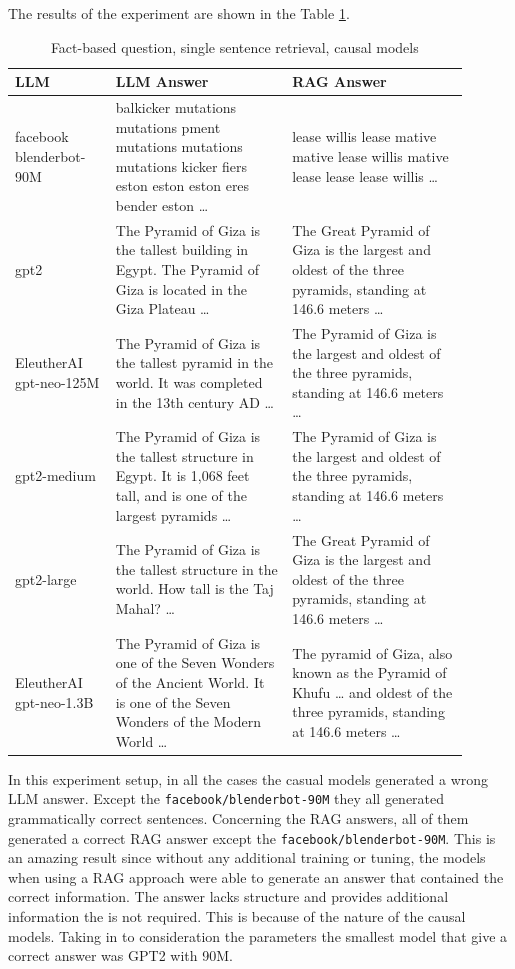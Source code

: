 \documentclass{wseas}
\begin{document}
The results of the experiment are shown in the Table \ref{tab:experiment_R_1_sentence_Q_fact_M_casual_table}.
\begin{table}[htbp]
  \centering
  \caption{Fact-based question, single sentence retrieval, causal models}
  \label{tab:experiment_R_1_sentence_Q_fact_M_casual_table}
    \begin{tabular}{|p{0.20\linewidth}|p{0.35\linewidth}|p{0.35\linewidth}|}
      \hline
      \textbf{LLM} & \textbf{LLM Answer} & \textbf{RAG Answer} \\ \hline
      facebook blenderbot-90M & balkicker mutations mutations pment mutations mutations mutations kicker fiers eston eston eston eres bender eston \ldots{} & lease willis lease mative mative lease willis mative lease lease lease willis \ldots{} \\ \hline
      gpt2 & The Pyramid of Giza is the tallest building in Egypt. The Pyramid of Giza is located in the Giza Plateau \ldots{} & The Great Pyramid of Giza is the largest and oldest of the three pyramids, standing at 146.6 meters \ldots{} \\ \hline
      EleutherAI gpt-neo-125M & The Pyramid of Giza is the tallest pyramid in the world. It was completed in the 13th century AD \ldots{} & The Pyramid of Giza is the largest and oldest of the three pyramids, standing at 146.6 meters \ldots{} \\ \hline
      gpt2-medium & The Pyramid of Giza is the tallest structure in Egypt. It is 1,068 feet tall, and is one of the largest pyramids \ldots{} & The Pyramid of Giza is the largest and oldest of the three pyramids, standing at 146.6 meters \ldots{} \\ \hline
      gpt2-large & The Pyramid of Giza is the tallest structure in the world. How tall is the Taj Mahal? \ldots{} & The Great Pyramid of Giza is the largest and oldest of the three pyramids, standing at 146.6 meters \ldots{} \\ \hline
      EleutherAI gpt-neo-1.3B & The Pyramid of Giza is one of the Seven Wonders of the Ancient World. It is one of the Seven Wonders of the Modern World \ldots{} & The pyramid of Giza, also known as the Pyramid of Khufu \ldots{} and oldest of the three pyramids, standing at 146.6 meters \ldots{} \\ \hline
    \end{tabular}
\end{table}
In this experiment setup, in all the cases the casual models generated a wrong LLM answer. Except
the \texttt{facebook/blenderbot-90M} they all generated grammatically
correct sentences. Concerning the RAG answers, all of them generated a
correct RAG answer except the \texttt{facebook/blenderbot-90M}. This is
an amazing result since without any additional training or tuning, the
models when using a RAG approach were able to generate an answer that 
contained the correct information. The answer lacks structure and provides 
additional information the is not required. This is because of the nature of the causal models.
Taking in to consideration the parameters the smallest model that give a
correct answer was GPT2 with 90M.
\end{document}

